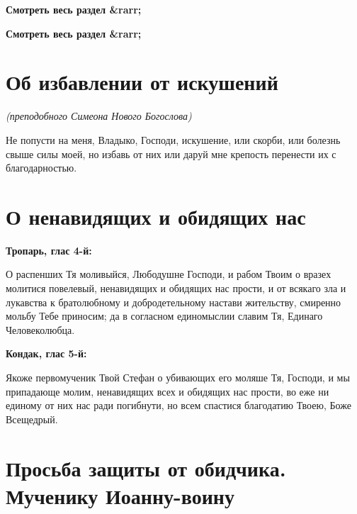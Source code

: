 


\bfseries Смотреть весь раздел &rarr;\normalfont{} 


\bfseries Смотреть весь раздел &rarr;\normalfont{} 

\section{Об избавлении от искушений}
 


\itshape (преподобного Симеона Нового Богослова)

\normalfont{}Не попусти на меня, Владыко, Господи, искушение, или скорби, или болезнь свыше силы моей, но избавь от них или даруй мне крепость перенести их с благодарностью.





\section{О ненавидящих и обидящих нас}
 


\bfseries Тропарь, глас 4-й:\normalfont{}


О распенших Тя моливыйся, Любодушне Господи, и рабом Твоим о вразех молитися повелевый, ненавидящих и обидящих нас прости, и от всякаго зла и лукавства к братолюбному и добродетельному настави жительству, смиренно мольбу Тебе приносим; да в согласном единомыслии славим Тя, Единаго Человеколюбца.


\medskip


\bfseries Кондак, глас 5-й:\normalfont{}


Якоже первомученик Твой Стефан о убивающих его моляше Тя, Господи, и мы припадающе молим, ненавидящих всех и обидящих нас прости, во еже ни единому от них нас ради погибнути, но всем спастися благодатию Твоею, Боже Всещедрый.


\section{Просьба защиты от обидчика. Мученику Иоанну-воину}
 


